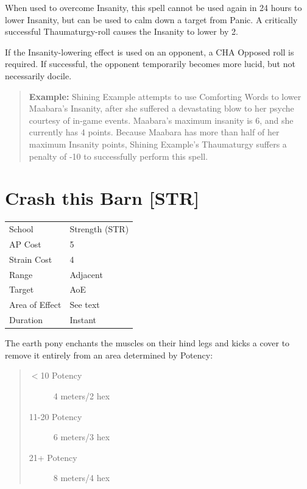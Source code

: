 \documentclass[11pt,a4paper,twocolumn]{book}
\begin{document}
When used to overcome Insanity, this spell cannot be used again in 24 hours to lower Insanity, but can be used to calm down a target from Panic. A critically successful Thaumaturgy-roll causes the Insanity to lower by 2.

If the Insanity-lowering effect is used on an opponent, a CHA Opposed roll is required. If successful, the opponent temporarily becomes more lucid, but not necessarily docile.

\begin{verse}
	\textbf{Example:} Shining Example attempts to use Comforting Words to lower Maabara's Insanity, after she suffered a devastating blow to her psyche courtesy of in-game events. Maabara's maximum insanity is 6, and she currently has 4 points. Because Maabara has more than half of her maximum Insanity points, Shining Example's Thaumaturgy suffers a penalty of -10 to successfully perform this spell.
\end{verse}


\section*{Crash this Barn [STR]}
{
	\begin{tabu} to 75mm{| X[l,4] | X[l,7] |}
		\hline
		School 			& Strength (STR) 	\\
        AP Cost	      	& 5 				\\
        Strain Cost     & 4 				\\
        Range     		& Adjacent 			\\
        Target      	& AoE 				\\
        Area of Effect  & See text 	 		\\
        Duration     	& Instant 			\\ \hline
	\end{tabu}
		
}

\medskip

The earth pony enchants the muscles on their hind legs and kicks a cover to remove it entirely from an area determined by Potency:

\begin{quote}
  \begin{description}
    \item[$<$10 Potency] 	4 meters/2 hex
    \item[11-20 Potency] 	6 meters/3 hex
    \item[21+ Potency] 	8 meters/4 hex
  \end{description}
\end{quote}
\end{document}

